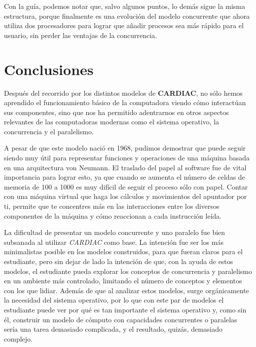 \documentclass[letterpaper,12pt,oneside]{book}
\begin{document}
\begin{enumerate}
			\end{enumerate}
			
			
			Con la guía, podemos notar que, salvo algunos puntos, lo demás sigue la misma estructura, porque finalmente es una evolución
			del modelo concurrente que ahora utiliza dos procesadores para lograr que añadir procesos sea más rápido para el usuario, sin
			perder las ventajas de la concurrencia.

\chapter{Conclusiones}


			Después del recorrido por los distintos modelos de \textbf{CARDIAC}, no sólo hemos aprendido el funcionamiento básico de la computadora
			viendo cómo interactúan sus componentes, sino que nos ha permitido adentrarnos
			en otros aspectos relevantes de las computadoras modernas como
			el sistema operativo, la concurrencia y el paralelismo.
			
			A pesar de que este modelo nació en 1968, pudimos demostrar que puede
			seguir siendo muy útil para representar funciones y operaciones de una máquina basada
			en una arquitectura von Neumann. El traslado del papel al software fue de vital importancia para lograr esto, ya que cuando se aumenta
			el número de celdas de memoria de 100 a 1000 es muy difícil de seguir el proceso sólo con papel. Contar con una máquina virtual que haga los
			cálculos y movimientos del apuntador por ti, permite que te concentres más en las interacciones  
			entre los diversos componentes de la máquina y cómo reaccionan a cada instrucción leída.
			
			La dificultad de presentar un modelo concurrente y uno paralelo fue bien subsanada al
			utilizar \textit{CARDIAC} como base. La intención fue ser
			los más minimalistas posible en los modelos construidos, para que fueran claros para el estudiante, pero sin dejar de lado la intención
			de que, con la ayuda de estos modelos, el estudiante pueda explorar los conceptos de concurrencia y paralelismo en un ambiente
			más controlado, limitando el número de conceptos y elementos con los que lidiar. Además de que al analizar estos modelos,
			surge orgánicamente la necesidad del sistema operativo, por lo que con este par de modelos el estudiante puede ver
			por qué es tan importante el sistema operativo y, como sin él, construir un modelo de cómputo con capacidades concurrentes o paralelas
			sería una tarea demasiado complicada, y el resultado, quizás, demasiado complejo.
			
\end{document}
